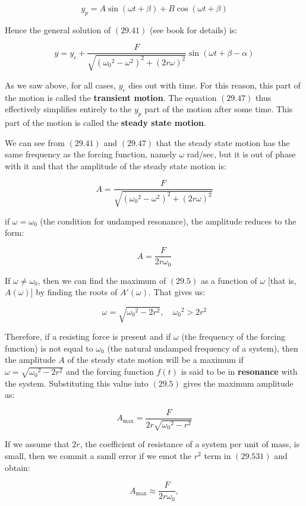 \documentclass{article}
\begin{document}
\[ \tag{29.42} y_p = A\sin{(\omega t + \beta)} + B\cos{(\omega t + \beta)} \]

Hence the general solution of $(29.41)$ (see book for details) is:

\[ \tag{29.47} y = y_c + \frac{F}{\sqrt{( {\omega_0}^2 - \omega^2)^2 + (2r\omega)^2}} \sin{(\omega t + \beta - \alpha)} \]

As we saw above, for all cases, $y_c$ dies out with time. For this reason, this part of the motion is called the \textbf{transient motion}. The equation $(29.47)$ thus effectively simplifies entirely to the $y_p$ part of the motion after some time. This part of the motion is called the \textbf{steady state motion}.

We can see from $(29.41)$ and $(29.47)$ that the steady state motion has the same frequency as the forcing function, namely $\omega$ rad/sec, but it is out of phase with it and that the amplitude of the steady state motion is:

\[ \tag{29.5} A = \frac{F}{\sqrt{( {\omega_0}^2 - \omega^2)^2 + (2r\omega)^2}} \]

if $\omega = \omega_0$ (the condition for undamped resonance), the amplitude reduces to the form:

\[ \tag{29.51} A = \frac{F}{2r \omega_0} \]

If $\omega \neq \omega_0$, then we can find the maximum of $(29.5)$ as a function of $\omega$ [that is, $A(\omega)$] by finding the roots of $A'(\omega)$. That gives us:

\[ \tag{29.53} \omega = \sqrt{ {\omega_0}^2 - 2r^2}, \quad {\omega_0}^2 > 2r^2 \]

Therefore, if a resisting force is present and if $\omega$ (the frequency of the forcing function) is not equal to $\omega_0$ (the natural undamped frequency of a system), then the amplitude $A$ of the steady state motion will be a maximum if $\omega = \sqrt{ {\omega_0}^2 - 2r^2}$ and the forcing function $f(t)$ is said to be in \textbf{resonance} with the system. Substituting this value into $(29.5)$ gives the maximum amplitude as:

\[ \tag{29.531} A_\text{max} = \frac{F}{2r\sqrt{ {\omega_0}^2 - r^2}} \]

If we assume that $2r$, the coefficient of resistance of a system per unit of mass, is small, then we commit a samll error if we emot the $r^2$ term in $(29.531)$ and obtain:

\[ \tag{29.532} A_\text{max} \approx \frac{F}{2r\omega_0}, \]
\end{document}

